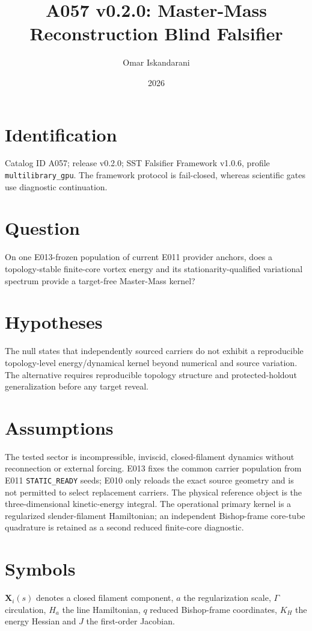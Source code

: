 \documentclass[11pt]{article}
\title{A057 v0.2.0: Master-Mass Reconstruction Blind Falsifier}
\author{Omar Iskandarani}
\date{2026}
\begin{document}
\maketitle

\section{Identification}
Catalog ID A057; release v0.2.0; SST Falsifier Framework v1.0.6, profile \texttt{multilibrary\_gpu}. The framework protocol is fail-closed, whereas scientific gates use diagnostic continuation.

\section{Question}
On one E013-frozen population of current E011 provider anchors, does a topology-stable finite-core vortex energy and its stationarity-qualified variational spectrum provide a target-free Master-Mass kernel?

\section{Hypotheses}
The null states that independently sourced carriers do not exhibit a reproducible topology-level energy/dynamical kernel beyond numerical and source variation. The alternative requires reproducible topology structure and protected-holdout generalization before any target reveal.

\section{Assumptions}
The tested sector is incompressible, inviscid, closed-filament dynamics without reconnection or external forcing. E013 fixes the common carrier population from E011 \texttt{STATIC\_READY} seeds; E010 only reloads the exact source geometry and is not permitted to select replacement carriers. The physical reference object is the three-dimensional kinetic-energy integral. The operational primary kernel is a regularized slender-filament Hamiltonian; an independent Bishop-frame core-tube quadrature is retained as a second reduced finite-core diagnostic.

\section{Symbols}
\(\mathbf X_i(s)\) denotes a closed filament component, \(a\) the regularization scale, \(\Gamma\) circulation, \(H_a\) the line Hamiltonian, \(q\) reduced Bishop-frame coordinates, \(K_H\) the energy Hessian and \(J\) the first-order Jacobian.
\end{document}

